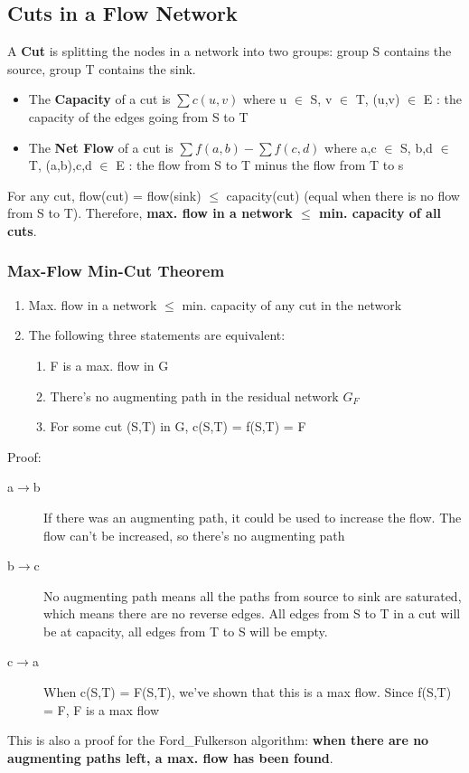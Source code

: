 \subsection{Cuts in a Flow Network}
A \textbf{Cut} is splitting the nodes in a network into two groups: group S contains the source, group T contains the sink. 
\begin{itemize}
    \item The \textbf{Capacity} of a cut is $\sum c(u,v)$ where u $\in$ S, v $\in$ T, (u,v) $\in$ E : the capacity of the edges going from S to T
    \item The \textbf{Net Flow} of a cut is $\sum f(a,b) - \sum f(c,d)$ where a,c $\in$ S, b,d $\in$ T, (a,b),c,d $\in$ E : the flow from S to T minus the flow from T to s
\end{itemize}
For any cut, flow(cut) = flow(sink) $\leq$ capacity(cut) (equal when there is no flow from S to T). Therefore, \textbf{max. flow in a network $\boldsymbol{\leq}$ min. capacity of all cuts}.

\subsubsection{Max-Flow Min-Cut Theorem}
\begin{enumerate}
    \item Max. flow in a network $\leq$ min. capacity of any cut in the network
    \item The following three statements are equivalent:
    \begin{enumerate}
        \item F is a max. flow in G 
        \item There's no augmenting path in the residual network $G_F$
        \item For some cut (S,T) in G, c(S,T) = f(S,T) = F 
    \end{enumerate}
\end{enumerate}

Proof:
\begin{description}
    \item [a$\rightarrow$b] If there was an augmenting path, it could be used to increase the flow. The flow can't be increased, so there's no augmenting path
    \item [b$\rightarrow$c] No augmenting path means all the paths from source to sink are saturated, which means there are no reverse edges. All edges from S to T in a cut will be at capacity, all edges from T to S will be empty.
    \item [c$\rightarrow$a] When c(S,T) = F(S,T), we've shown that this is a max flow. Since f(S,T) = F, F is a max flow
\end{description}

\noindent This is also a proof for the Ford\_Fulkerson algorithm: \textbf{when there are no augmenting paths left, a max. flow has been found}. 
